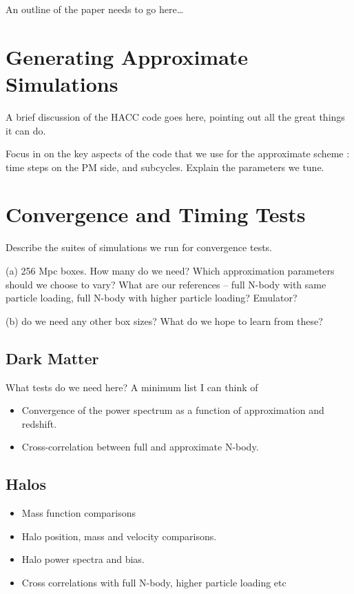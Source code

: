 \documentclass[usenatbib]{mn2e}
\begin{document}
An outline of the paper needs to go here\ldots

\section{Generating Approximate Simulations}

A brief discussion of the HACC code goes here, pointing out all the great things
it can do. 

Focus in on the key aspects of the code that we use for the approximate scheme :
time steps on the PM side, and subcycles. Explain the parameters we tune.


\section{Convergence and Timing Tests}

Describe the suites of simulations we run for convergence tests. 

(a) 256 Mpc boxes. How many do we need?  Which
approximation parameters should we choose to vary? What are our references --
full N-body with same particle loading, full N-body with higher particle
loading? Emulator?

(b) do we need any other box sizes? What do we hope to learn from these?

\subsection{Dark Matter}

What tests do we need here? A minimum list I can think of 
\begin{itemize}
  \item Convergence of the power spectrum as a function of approximation and
  redshift.
  \item Cross-correlation between full and approximate N-body.
\end{itemize}

\subsection{Halos}

\begin{itemize}
  \item Mass function comparisons
  \item Halo position, mass and velocity comparisons.
  \item Halo power spectra and bias. 
  \item Cross correlations with full N-body, higher particle loading etc
\end{itemize}
\end{document}
